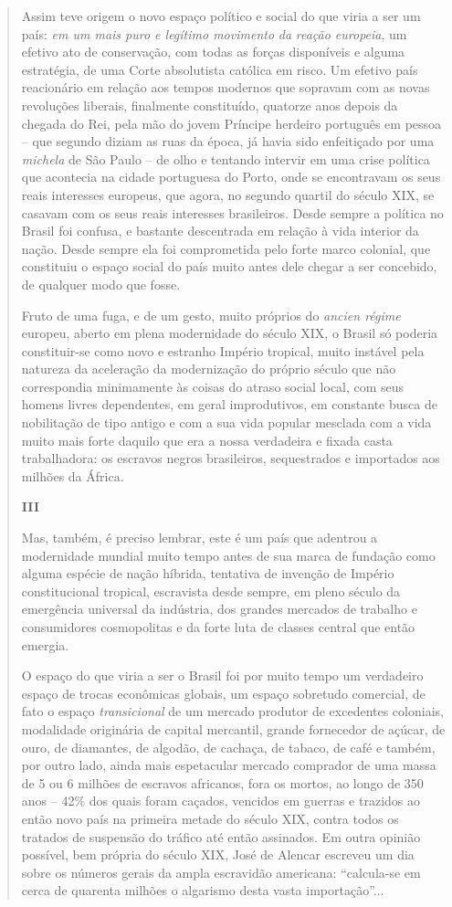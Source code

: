 \begin{quote}
Assim teve origem o novo espaço político e social do que viria a ser um
país: \emph{em um mais puro e legítimo movimento} \emph{da} \emph{reação
europeia}, um efetivo ato de conservação, com todas as forças
disponíveis e alguma estratégia, de uma Corte absolutista católica em
risco. Um efetivo país reacionário em relação aos tempos modernos que
sopravam com as novas revoluções liberais, finalmente constituído,
quatorze anos depois da chegada do Rei, pela mão do jovem Príncipe
herdeiro português em pessoa -- que segundo diziam as ruas da época, já
havia sido enfeitiçado por uma \emph{michela} de São Paulo -- de olho e
tentando intervir em uma crise política que acontecia na cidade
portuguesa do Porto, onde se encontravam os seus reais interesses
europeus, que agora, no segundo quartil do século XIX, se casavam com os
seus reais interesses brasileiros. Desde sempre a política no Brasil foi
confusa, e bastante descentrada em relação à vida interior da nação.
Desde sempre ela foi comprometida pelo forte marco colonial, que
constituiu o espaço social do país muito antes dele chegar a ser
concebido, de qualquer modo que fosse.

Fruto de uma fuga, e de um gesto, muito próprios do \emph{ancien régime}
europeu, aberto em plena modernidade do século XIX, o Brasil só poderia
constituir-se como novo e estranho Império tropical, muito instável pela
natureza da aceleração da modernização do próprio século que não
correspondia minimamente às coisas do atraso social local, com seus
homens livres dependentes, em geral improdutivos, em constante busca de
nobilitação de tipo antigo e com a sua vida popular mesclada com a vida
muito mais forte daquilo que era a nossa verdadeira e fixada casta
trabalhadora: os escravos negros brasileiros, sequestrados e importados
aos milhões da África.

\textbf{III}

Mas, também, é preciso lembrar, este é um país que adentrou a
modernidade mundial muito tempo antes de sua marca de fundação como
alguma espécie de nação híbrida, tentativa de invenção de Império
constitucional tropical, escravista desde sempre, em pleno século da
emergência universal da indústria, dos grandes mercados de trabalho e
consumidores cosmopolitas e da forte luta de classes central que então
emergia.

O espaço do que viria a ser o Brasil foi por muito tempo um verdadeiro
espaço de trocas econômicas globais, um espaço sobretudo comercial, de
fato o espaço \emph{transicional} de um mercado produtor de excedentes
coloniais, modalidade originária de capital mercantil, grande fornecedor
de açúcar, de ouro, de diamantes, de algodão, de cachaça, de tabaco, de
café e também, por outro lado, ainda mais espetacular mercado comprador
de uma massa de 5 ou 6 milhões de escravos africanos, fora os mortos, ao
longo de 350 anos -- 42\% dos quais foram caçados, vencidos em guerras e
trazidos ao então novo país na primeira metade do século XIX, contra
todos os tratados de suspensão do tráfico até então assinados. Em outra
opinião possível, bem própria do século XIX, José de Alencar escreveu um
dia sobre os números gerais da ampla escravidão americana: ``calcula-se
em cerca de quarenta milhões o algarismo desta vasta importação''...


\end{quote}
